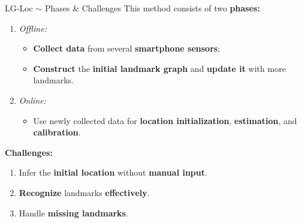 \begin{frame}{LG-Loc $\sim$ Phases \& Challenges}
    This method consists of two \textbf{phases:}
    \begin{enumerate}
        \item \textit{Offline:}
        \begin{itemize}
            \item \textbf{Collect data} from several \textbf{smartphone sensors};
            \item \textbf{Construct} the \textbf{initial landmark graph} and \textbf{update it} with more landmarks.
        \end{itemize}
        \item \textit{Online:}
        \begin{itemize}
            \item Use newly collected data for \textbf{location initialization}, \textbf{estimation}, and \textbf{calibration}.
        \end{itemize}
    \end{enumerate}

    \textbf{Challenges:}
    \begin{enumerate}
        \item Infer the \textbf{initial location} without \textbf{manual input}.
        \item \textbf{Recognize} landmarks \textbf{effectively}.
        \item Handle \textbf{missing landmarks}.
    \end{enumerate}
\end{frame}